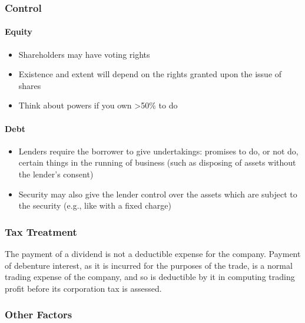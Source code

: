 \documentclass[
]{article}
\providecommand{\tightlist}{%
  \setlength{\itemsep}{0pt}\setlength{\parskip}{0pt}}
\begin{document}
\hypertarget{control}{%
\subsubsection{Control}\label{control}}

\hypertarget{equity-3}{%
\paragraph{Equity}\label{equity-3}}

\begin{itemize}
\tightlist
\item
  Shareholders may have voting rights
\item
  Existence and extent will depend on the rights granted upon the issue
  of shares
\item
  Think about powers if you own \textgreater50\% to do
\end{itemize}

\hypertarget{debt-3}{%
\paragraph{Debt}\label{debt-3}}

\begin{itemize}
\tightlist
\item
  Lenders require the borrower to give undertakings: promises to do, or
  not do, certain things in the running of business (such as disposing
  of assets without the lender's consent)
\item
  Security may also give the lender control over the assets which are
  subject to the security (e.g., like with a fixed charge)
\end{itemize}

\hypertarget{tax-treatment}{%
\subsubsection{Tax Treatment}\label{tax-treatment}}

The payment of a dividend is not a deductible expense for the company.
Payment of debenture interest, as it is incurred for the purposes of the
trade, is a normal\\
trading expense of the company, and so is deductible by it in computing
trading profit before its corporation tax is assessed.

\hypertarget{other-factors}{%
\subsubsection{Other Factors}\label{other-factors}}
\end{document}
